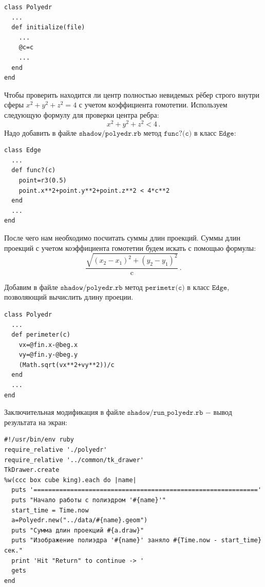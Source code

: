 \begin{small}
\begin{verbatim}
class Polyedr 
  ...
  def initialize(file)
    ...
    @c=c
    ...
  end
end
\end{verbatim}
\end{small}
Чтобы проверить находится ли центр полностью невидемых рёбер строго внутри сферы $x^2+y^2+z^2=4$ с учетом 
коэффициента гомотетии. Используем следующую формулу для проверки центра ребра:
$$x^2+y^2+z^2<4\,.$$
Надо добавить в файле $\texttt{shadow/polyedr.rb}$ 
метод $\texttt{func?(c)}$ в класс $\texttt{Edge}$:
\begin{small}
\begin{verbatim}
class Edge 
  ...
  def func?(c)
    point=r3(0.5)
    point.x**2+point.y**2+point.z**2 < 4*c**2
  end
  ...
end
\end{verbatim}
\end{small}


После чего нам необходимо посчитать суммы длин проекций. Суммы длин проекций с учетом коэффициента гомотетии
будем искать с помощью формулы:
$$\frac{\sqrt{(x_2-x_1)^2+(y_2-y_1)^2}}{\mathrm{c}} \,. $$



Добавим в файле $\texttt{shadow/polyedr.rb}$ метод $\texttt{perimetr(c)}$ в класс $\texttt{Edge}$, позволяющий вычислить длину проеции.

\begin{small}
\begin{verbatim}
class Polyedr 
  ...
  def perimeter(c)
    vx=@fin.x-@beg.x
    vy=@fin.y-@beg.y
    (Math.sqrt(vx**2+vy**2))/c
  end	
  ...
end
\end{verbatim}
\end{small}

Заключительная модификация в файле $\texttt{shadow/run\_polyedr.rb}$ $-$ вывод результата на экран:

\begin{small}
\begin{verbatim}
#!/usr/bin/env ruby
require_relative './polyedr'
require_relative '../common/tk_drawer'
TkDrawer.create
%w(ccc box cube king).each do |name|
  puts '============================================================='
  puts "Начало работы с полиэдром '#{name}'"
  start_time = Time.now
  a=Polyedr.new("../data/#{name}.geom")
  puts "Сумма длин проекций #{a.draw}"
  puts "Изображение полиэдра '#{name}' заняло #{Time.now - start_time} сек."
  print 'Hit "Return" to continue -> '
  gets
end
\end{verbatim}
\end{small}

